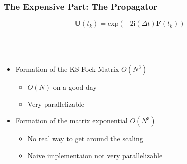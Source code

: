\documentclass{beamer}
\newcommand{\bpar}[1]{\left( #1 \right)}                  %
\renewcommand{\exp}[1]{\mathrm{exp}\bpar{#1}}
\begin{document}
\begin{frame}
\frametitle{The Expensive Part: The Propagator}
{ \LARGE
\begin{equation*}
\mathbf{U}(t_k) = \exp{-2\mathrm{i}(\Delta t) \mathbf{F}(t_k)}
\end{equation*}
}
~\\
~\\
~\\


\begin{itemize}
  \item Formation of the KS Fock Matrix $O(N^3)$
  \begin{itemize}
    \normalsize
    \item $O(N)$ on a good day
    \item Very parallelizable
  \end{itemize}
  \item Formation of the matrix exponential $O(N^3)$
  \begin{itemize}
    \normalsize
    \item No real way to get around the scaling
    \item Naive implementaion not very parallelizable
  \end{itemize}
\end{itemize}

\end{frame}
\end{document}
